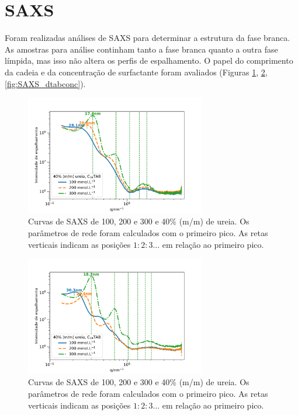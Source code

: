 	\FloatBarrier
\section{SAXS} 
\label{sec:SAXS_ureia}

	Foram realizadas análises de SAXS para determinar a estrutura da fase branca. As amostras para análise continham tanto a fase branca quanto a outra fase límpida, mas isso não altera os perfis de espalhamento. O papel do comprimento da cadeia e da concentração de surfactante foram avaliados (Figuras \ref{fig:SAXS_ctabconc}, \ref{fig:SAXS_ttabconc}, \ref{fig:SAXS_dtabconc}).
	
	\begin{figure}[h]
		\centering
		\includegraphics[width=0.7\textwidth]{imagens/saxs/CTAB_conc}
		\caption{Curvas de SAXS de \CTAB{} 100, 200 e 300 \mM{} e 40\% (m/m) de ureia. Os parâmetros de rede foram calculados com o primeiro pico. As retas verticais indicam as posições \(1:2:3\dots\) em relação ao primeiro pico.}
		\label{fig:SAXS_ctabconc}
	\end{figure}
	
	\begin{figure}[h]
		\centering
		\includegraphics[width=0.7\textwidth]{imagens/saxs/TTAB_conc}
		\caption{Curvas de SAXS de \TTAB{} 100, 200 e 300 \mM{} e 40\% (m/m) de ureia. Os parâmetros de rede foram calculados com o primeiro pico. As retas verticais indicam as posições \(1:2:3\dots\) em relação ao primeiro pico.}
		\label{fig:SAXS_ttabconc}
	\end{figure}
	
